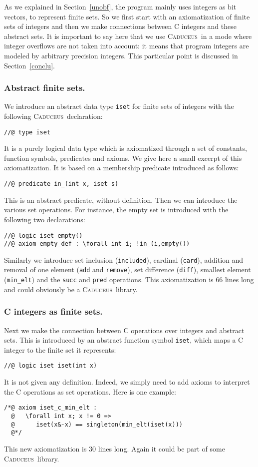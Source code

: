 \documentclass[a4paper]{llncs}
\newcommand{\caduceus}{\textsc{Caduceus}}
\begin{document}
As we explained in Section~\ref{unobf}, the program mainly uses integers
as bit vectors, to represent finite sets.  So we first start with an
axiomatization of finite sets of integers and then we make connections
between C integers and these abstract sets. It is important to say
here that we use \caduceus\ in a mode where integer overflows are not
taken into account: it means that program integers are modeled by arbitrary
precision integers. This particular point is discussed in
Section~\ref{conclu}. 

\subsubsection{Abstract finite sets.}
We introduce an abstract data type \texttt{iset} for finite sets of
integers with the following \caduceus\ declaration:
\begin{verbatim}
//@ type iset
\end{verbatim}
It is a purely logical data type which is axiomatized through a set of
constants, function symbols, predicates and axioms. We give here a small 
excerpt of this axiomatization. It is based on a
membership predicate  introduced as follows:
\begin{verbatim}
//@ predicate in_(int x, iset s)
\end{verbatim}
This is an abstract predicate, without definition. Then we can introduce
the various set operations. For instance, the empty set is introduced
with the following two declarations:
\begin{verbatim}
//@ logic iset empty()
//@ axiom empty_def : \forall int i; !in_(i,empty())
\end{verbatim}
Similarly we introduce set inclusion (\texttt{included}), cardinal
(\texttt{card}), addition and removal
of one element (\texttt{add} and 
\texttt{remove}), set difference (\texttt{diff}), smallest element
(\texttt{min\_elt}) and the \texttt{succ} and \texttt{pred} operations.
This axiomatization is 66 lines long and could obviously be a 
\caduceus\ library.

\subsubsection{C integers as finite sets.}
Next we make the connection between C operations over integers and
abstract sets. This is introduced by an abstract function symbol
\texttt{iset}, which maps a C integer to the finite set it represents:
\begin{verbatim}
//@ logic iset iset(int x)
\end{verbatim}
It is not given any definition. Indeed, we simply need to 
add axioms to interpret the C operations as set operations.
Here is one example:
\begin{verbatim}
/*@ axiom iset_c_min_elt :
  @   \forall int x; x != 0 =>
  @      iset(x&-x) == singleton(min_elt(iset(x)))
  @*/
\end{verbatim}
This new axiomatization is 30 lines long. Again it could be part of some
\caduceus\ library.
\end{document}
